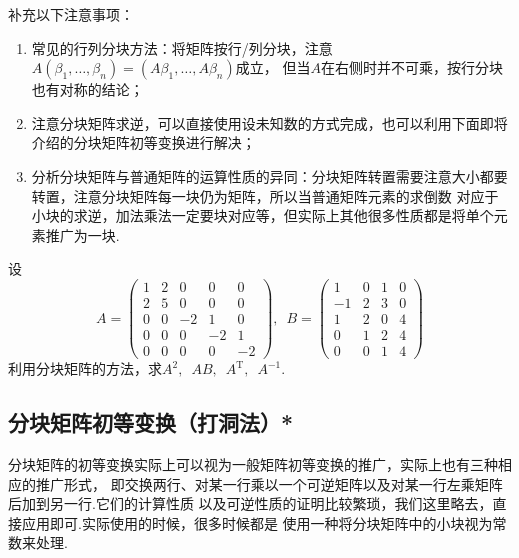 补充以下注意事项：
\begin{enumerate}
    \item 常见的行列分块方法：将矩阵按行/列分块，注意$A(\beta_1,\ldots,\beta_n)=(A\beta_1,\ldots,A\beta_n)$成立，
    但当$A$在右侧时并不可乘，按行分块也有对称的结论；

    \item 注意分块矩阵求逆，可以直接使用设未知数的方式完成，也可以利用下面即将介绍的分块矩阵初等变换进行解决；

    \item 分析分块矩阵与普通矩阵的运算性质的异同：分块矩阵转置需要注意大小都要转置，注意分块矩阵每一块仍为矩阵，所以当普通矩阵元素的求倒数
    对应于小块的求逆，加法乘法一定要块对应等，但实际上其他很多性质都是将单个元素推广为一块.
\end{enumerate}

\begin{example}
    设\[A=\begin{pmatrix}
        1 & 2 & 0 & 0 & 0 \\
        2 & 5 & 0 & 0 & 0 \\
        0 & 0 & -2 & 1 & 0 \\
        0 & 0 & 0 & -2 & 1 \\
        0 & 0 & 0 & 0 & -2
    \end{pmatrix},\enspace B=\begin{pmatrix}
        1 & 0 & 1 & 0 \\
        -1 & 2 & 3 & 0 \\
        1 & 2 & 0 & 4 \\
        0 & 1 & 2 & 4 \\
        0 & 0 & 1 & 4
    \end{pmatrix}\]
    利用分块矩阵的方法，求$A^2,\enspace AB,\enspace A^\mathrm{T},\enspace A^{-1}$.
\end{example}

\subsection{分块矩阵初等变换（打洞法）*}
分块矩阵的初等变换实际上可以视为一般矩阵初等变换的推广，实际上也有三种相应的推广形式，
即交换两行、对某一行乘以一个可逆矩阵以及对某一行左乘矩阵后加到另一行.它们的计算性质
以及可逆性质的证明比较繁琐，我们这里略去，直接应用即可.实际使用的时候，很多时候都是
使用一种将分块矩阵中的小块视为常数来处理.

